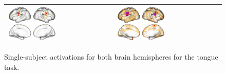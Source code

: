 \documentclass{article}
\begin{document}
\begin{figure}
\begin{tabularx}{\textwidth}{|X|X|}
			\includegraphics[width=0.48\textwidth]{plots/603_subject_114823_tongue_task_activations_classical.png} &
			\includegraphics[width=0.48\textwidth]{plots/603_subject_114823_tongue_task_activations.png} \\ \hline
		\end{tabularx}
		\caption{Single-subject activations for both brain hemispheres for the tongue task.}
		\label{fig:tongue_act_single_subject}
	\end{figure}
\end{document}
